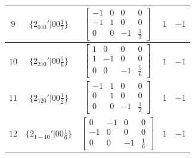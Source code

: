 \documentclass[fleqn,8pt]{jsarticle}
\begin{document}
\begin{longtable}{ccccc}
$ 9 $ & $ \{2{}_{010}{}'|0 0 \frac{1}{3}\} $ & $ \begin{bmatrix} -1 & 0 & 0 & 0 \\ -1 & 1 & 0 & 0 \\ 0 & 0 & -1 & \frac{1}{3} \end{bmatrix} $ & $ 1 $ & $ -1 $ \\ \hline
$ 10 $ & $ \{2{}_{210}{}'|0 0 \frac{5}{6}\} $ & $ \begin{bmatrix} 1 & 0 & 0 & 0 \\ 1 & -1 & 0 & 0 \\ 0 & 0 & -1 & \frac{5}{6} \end{bmatrix} $ & $ 1 $ & $ -1 $ \\ \hline
$ 11 $ & $ \{2{}_{120}{}'|0 0 \frac{1}{2}\} $ & $ \begin{bmatrix} -1 & 1 & 0 & 0 \\ 0 & 1 & 0 & 0 \\ 0 & 0 & -1 & \frac{1}{2} \end{bmatrix} $ & $ 1 $ & $ -1 $ \\ \hline
$ 12 $ & $ \{2{}_{1-10}{}'|0 0 \frac{1}{6}\} $ & $ \begin{bmatrix} 0 & -1 & 0 & 0 \\ -1 & 0 & 0 & 0 \\ 0 & 0 & -1 & \frac{1}{6} \end{bmatrix} $ & $ 1 $ & $ -1 $ \\
\end{longtable}
\end{document}
